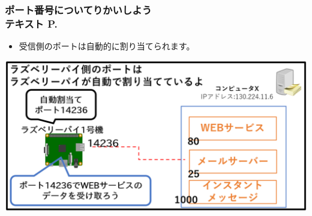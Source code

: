 \begin{frame}[fragile]
	\frametitle{\large{ポート番号についてりかいしよう\\テキスト P.\pageref{1:P:slide_p18}}~~~}
    \begin{itemize}\small
                \item 受信側のポートは自動的に割り当てられます。
            \end{itemize}
			\begin{minipage}{\textwidth}
                {\upshape
                  \includegraphics[width=\textwidth]{slide07-img/slide07-img013.png}}
            \end{minipage}
\end{frame}

